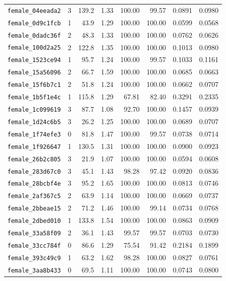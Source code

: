 \documentclass[11pt]{article}
\begin{document}
\begin{longtable}{lrrrrrrr}
\texttt{female\_04eeada2} & 3 & 139.2 & 1.33 & 100.00 & 99.57 & 0.0891 & 0.0980 \\
\texttt{female\_0d9c1fcb} & 1 & 43.9 & 1.29 & 100.00 & 100.00 & 0.0599 & 0.0568 \\
\texttt{female\_0dadc36f} & 2 & 48.3 & 1.33 & 100.00 & 100.00 & 0.0762 & 0.0626 \\
\texttt{female\_100d2a25} & 2 & 122.8 & 1.35 & 100.00 & 100.00 & 0.1013 & 0.0980 \\
\texttt{female\_1523ce94} & 1 & 95.7 & 1.24 & 100.00 & 99.57 & 0.1033 & 0.1161 \\
\texttt{female\_15a56096} & 2 & 66.7 & 1.59 & 100.00 & 100.00 & 0.0685 & 0.0663 \\
\texttt{female\_15f6b7c1} & 2 & 51.8 & 1.24 & 100.00 & 100.00 & 0.0662 & 0.0707 \\
\texttt{female\_1b5f1e4c} & 1 & 115.8 & 1.29 & 67.81 & 82.40 & 0.3291 & 0.2335 \\
\texttt{female\_1c099619} & 3 & 87.7 & 1.08 & 92.70 & 100.00 & 0.1457 & 0.0939 \\
\texttt{female\_1d24c6b5} & 3 & 26.2 & 1.25 & 100.00 & 100.00 & 0.0689 & 0.0707 \\
\texttt{female\_1f74efe3} & 0 & 81.8 & 1.47 & 100.00 & 99.57 & 0.0738 & 0.0714 \\
\texttt{female\_1f926647} & 1 & 130.5 & 1.31 & 100.00 & 100.00 & 0.0900 & 0.0923 \\
\texttt{female\_26b2c805} & 3 & 21.9 & 1.07 & 100.00 & 100.00 & 0.0594 & 0.0608 \\
\texttt{female\_283d67c0} & 3 & 45.1 & 1.43 & 98.28 & 97.42 & 0.0920 & 0.0836 \\
\texttt{female\_28bcbf4e} & 3 & 95.2 & 1.65 & 100.00 & 100.00 & 0.0813 & 0.0746 \\
\texttt{female\_2af367c5} & 2 & 63.9 & 1.14 & 100.00 & 100.00 & 0.0669 & 0.0737 \\
\texttt{female\_2bbeae15} & 2 & 71.2 & 1.46 & 100.00 & 99.14 & 0.0734 & 0.0768 \\
\texttt{female\_2dbed010} & 1 & 133.8 & 1.54 & 100.00 & 100.00 & 0.0863 & 0.0909 \\
\texttt{female\_33a58f09} & 2 & 36.1 & 1.43 & 99.57 & 99.57 & 0.0703 & 0.0730 \\
\texttt{female\_33cc784f} & 0 & 86.6 & 1.29 & 75.54 & 91.42 & 0.2184 & 0.1899 \\
\texttt{female\_393c49c9} & 1 & 63.2 & 1.62 & 98.28 & 100.00 & 0.0827 & 0.0761 \\
\texttt{female\_3aa8b433} & 0 & 69.5 & 1.11 & 100.00 & 100.00 & 0.0743 & 0.0800 \\

\end{longtable}
\end{document}

